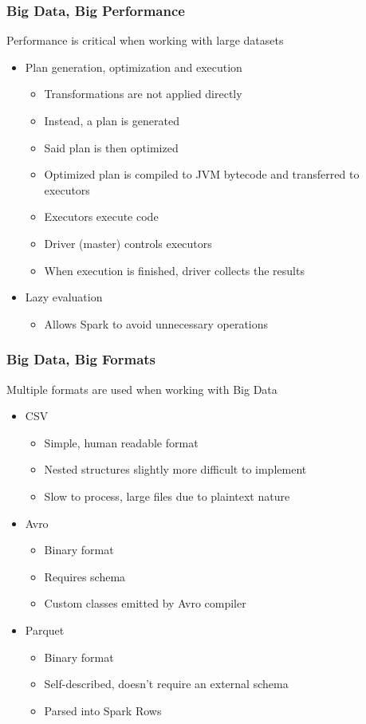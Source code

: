 \documentclass{beamer}
\begin{document}
\begin{frame}
\frametitle{Big Data, Big Performance}
Performance is critical when working with large datasets
\begin{itemize}
    \item Plan generation, optimization and execution
        \begin{itemize}
            \item Transformations are not applied directly
            \item Instead, a plan is generated
            \item Said plan is then optimized
            \item Optimized plan is compiled to JVM bytecode and transferred to executors
            \item Executors execute code
            \item Driver (master) controls executors
            \item When execution is finished, driver collects the results
        \end{itemize}
    \item Lazy evaluation
        \begin{itemize}
            \item Allows Spark to avoid unnecessary operations
        \end{itemize}
\end{itemize}
\end{frame}

\begin{frame}
\frametitle{Big Data, Big Formats}
Multiple formats are used when working with Big Data
\begin{itemize}
    \item CSV
        \begin{itemize}
            \item Simple, human readable format
            \item Nested structures slightly more difficult to implement
            \item Slow to process, large files due to plaintext nature
        \end{itemize}
    \item Avro
        \begin{itemize}
            \item Binary format
            \item Requires schema
            \item Custom classes emitted by Avro compiler
        \end{itemize}
    \item Parquet
        \begin{itemize}
            \item Binary format
            \item Self-described, doesn't require an external schema
            \item Parsed into Spark Rows
        \end{itemize}
\end{itemize}
\end{frame}
\end{document}
